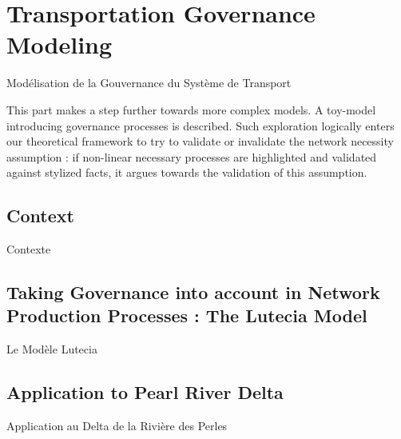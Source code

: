 




\section{Transportation Governance Modeling}{Modélisation de la Gouvernance du Système de Transport} %

\label{sec:lutetia} %



This part makes a step further towards more complex models. A toy-model introducing governance processes is described. Such exploration logically enters our theoretical framework to try to validate or invalidate the network necessity assumption : if non-linear necessary processes are highlighted and validated against stylized facts, it argues towards the validation of this assumption. 






\subsection{Context}{Contexte}


\subsection[The Lutecia Model][Le Modèle Lutecia]{Taking Governance into account in Network Production Processes : The Lutecia Model}{Le Modèle Lutecia}












\subsection[Application][Application]{Application to Pearl River Delta}{Application au Delta de la Rivière des Perles}





